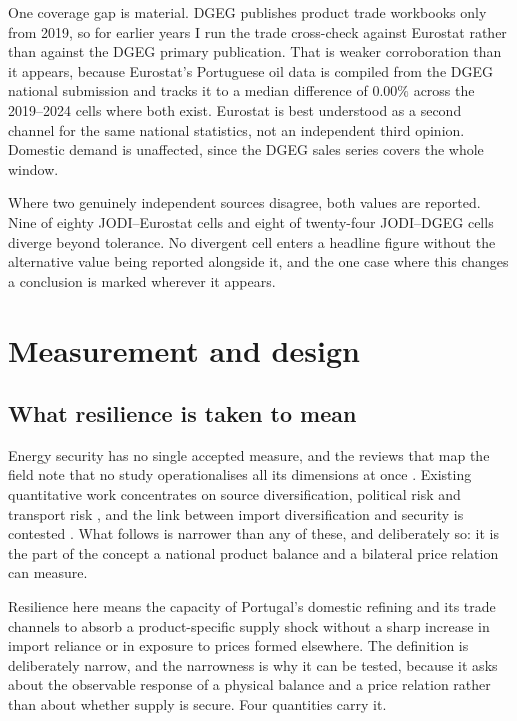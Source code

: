 \documentclass[11pt,a4paper]{article}
\begin{document}
One coverage gap is material. DGEG publishes product trade workbooks only from 2019, so for
earlier years I run the trade cross-check against Eurostat rather than against the DGEG primary
publication. That is weaker corroboration than it appears, because Eurostat's Portuguese oil
data is compiled from the DGEG national submission and tracks it to a median difference of
$0.00\%$ across the 2019--2024 cells where both exist. Eurostat is best understood as a second
channel for the same national statistics, not an independent third opinion. Domestic demand is
unaffected, since the DGEG sales series covers the whole window.

Where two genuinely independent sources disagree, both values are reported. Nine of eighty
JODI--Eurostat cells and eight of twenty-four JODI--DGEG cells diverge beyond tolerance. No
divergent cell enters a headline figure without the alternative value being reported alongside
it, and the one case where this changes a conclusion is marked wherever it appears.

\section{Measurement and design}
\label{sec:design}

\subsection{What resilience is taken to mean}

Energy security has no single accepted measure, and the reviews that map the field note that no
study operationalises all its dimensions at once \citep{kruyt2009indicators,
ang2015energysecurity}. Existing quantitative work concentrates on source diversification,
political risk and transport risk \citep{cohen2011measuring}, and the link between import
diversification and security is contested \citep{vivoda2009diversification}. What follows is
narrower than any of these, and deliberately so: it is the part of the concept a national
product balance and a bilateral price relation can measure.

Resilience here means the capacity of Portugal's domestic refining and its trade channels to
absorb a product-specific supply shock without a sharp increase in import reliance or in
exposure to prices formed elsewhere. The definition is deliberately narrow, and the narrowness is
why it can be tested, because it asks about the observable response of a physical balance and
a price relation rather than about whether supply is secure. Four quantities carry it.
\end{document}
